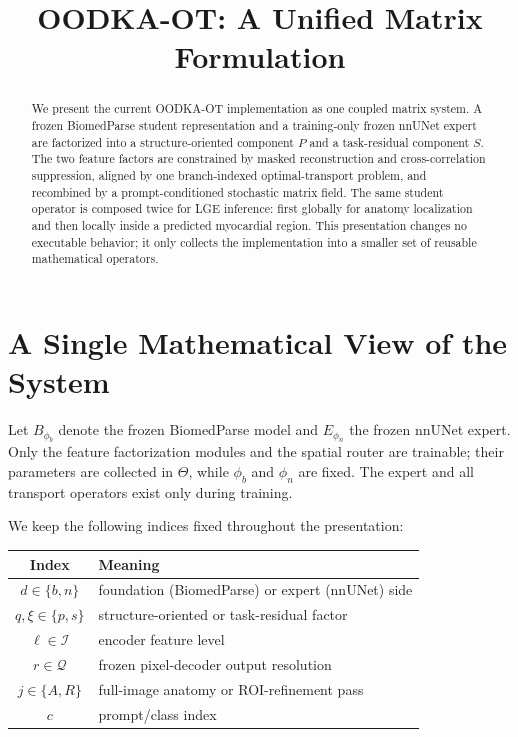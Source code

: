 \documentclass[10pt]{article}
\title{OODKA-OT: A Unified Matrix Formulation}
\date{}
\newcommand{\cI}{\mathcal{I}}
\newcommand{\cQ}{\mathcal{Q}}
\begin{document}
\maketitle

\begin{abstract}
We present the current OODKA-OT implementation as one coupled matrix system.
A frozen BiomedParse student representation and a training-only frozen nnUNet
expert are factorized into a structure-oriented component $P$ and a
task-residual component $S$.  The two feature factors are constrained by masked
reconstruction and cross-correlation suppression, aligned by one branch-indexed
optimal-transport problem, and recombined by a prompt-conditioned stochastic
matrix field.  The same student operator is composed twice for LGE inference:
first globally for anatomy localization and then locally inside a predicted
myocardial region.  This presentation changes no executable behavior; it only
collects the implementation into a smaller set of reusable mathematical
operators.
\end{abstract}

\section{A Single Mathematical View of the System}

Let $B_{\phi_b}$ denote the frozen BiomedParse model and $E_{\phi_n}$ the
frozen nnUNet expert.  Only the feature factorization modules and the spatial
router are trainable; their parameters are collected in $\Theta$, while
$\phi_b$ and $\phi_n$ are fixed.  The expert and all transport operators exist
only during training.

We keep the following indices fixed throughout the presentation:
\begin{center}
\begin{tabular}{cl}
\toprule
Index & Meaning \\
\midrule
$d\in\{b,n\}$ & foundation (BiomedParse) or expert (nnUNet) side \\
$q,\xi\in\{p,s\}$ & structure-oriented or task-residual factor \\
$\ell\in\cI$ & encoder feature level \\
$r\in\cQ$ & frozen pixel-decoder output resolution \\
$j\in\{A,R\}$ & full-image anatomy or ROI-refinement pass \\
$c$ & prompt/class index \\
\bottomrule
\end{tabular}
\end{center}
\end{document}
